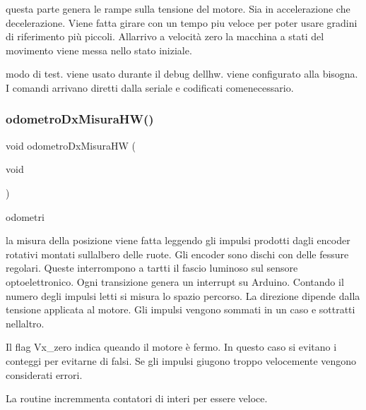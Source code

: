 questa parte genera le rampe sulla tensione del motore. Sia in accelerazione che decelerazione. Viene fatta girare con un tempo piu\textquotesingle{} veloce per poter usare gradini di riferimento più piccoli. All\textquotesingle{}arrivo a velocità zero la macchina a stati del movimento viene messa nello stato iniziale.

modo di test. viene usato durante il debug dell\textquotesingle{}hw. viene configurato alla bisogna. I comandi arrivano diretti dalla seriale e codificati comenecessario.\mbox{\label{ari_pi__2_d_c__esp__08_8ino_a6af06b46b74b5a44e1adc270e1e07e6b}} 
\subsubsection{\texorpdfstring{odometro\+Dx\+Misura\+H\+W()}{odometroDxMisuraHW()}}
{\footnotesize\ttfamily void odometro\+Dx\+Misura\+HW (\begin{DoxyParamCaption}\item[{void}]{ }\end{DoxyParamCaption})}



odometri 

la misura della posizione viene fatta leggendo gli impulsi prodotti dagli encoder rotativi montati sull\textquotesingle{}albero delle ruote. Gli encoder sono dischi con delle fessure regolari. Queste interrompono a tartti il fascio luminoso sul sensore optoelettronico. Ogni transizione genera un interrupt su Arduino. Contando il numero degli impulsi letti si misura lo spazio percorso. La direzione dipende dalla tensione applicata al motore. Gli impulsi vengono sommati in un caso e sottratti nell\textquotesingle{}altro.

Il flag Vx\+\_\+zero indica queando il motore è fermo. In questo caso si evitano i conteggi per evitarne di falsi. Se gli impulsi giugono troppo velocemente vengono considerati errori.

La routine incremmenta contatori di interi per essere veloce. \mbox{\label{ari_pi__2_d_c__esp__08_8ino_ae29b9282fc7ede860a2bb8984ad0560c}} 
